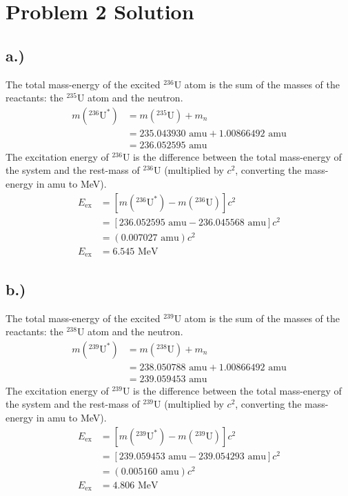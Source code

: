 \documentclass{report}
\begin{document}
\section*{Problem 2 Solution}

\subsection*{a.)}

The total mass-energy of the excited $^{236}$U atom is the sum of the masses of the reactants: the $^{235}$U atom and the neutron.
\begin{align*}
m(^{236}\text{U}^*)	&= m(^{235}\text{U}) + m_n \\
					&= 235.043930\text{ amu} + 1.00866492\text{ amu} \\
					&= 236.052595\text{ amu}
\end{align*}
The excitation energy of $^{236}$U is the difference between the total mass-energy of the system and the rest-mass of $^{236}$U (multiplied by $c^2$, converting the mass-energy in amu to MeV).
\begin{align*}
E_{\text{ex}}	&= \left[m(^{236}\text{U}^*) - m(^{236}\text{U})\right]c^2 \\
				&= \left[236.052595\text{ amu} - 236.045568\text{ amu}\right]c^2 \\
				&= (0.007027\text{ amu})c^2 \\
E_{\text{ex}}	&= 6.545\text{ MeV} 
\end{align*}


\subsection*{b.)}

The total mass-energy of the excited $^{239}$U atom is the sum of the masses of the reactants: the $^{238}$U atom and the neutron.
\begin{align*}
m(^{239}\text{U}^*)	&= m(^{238}\text{U}) + m_n \\
					&= 238.050788\text{ amu} + 1.00866492\text{ amu} \\
					&= 239.059453\text{ amu}
\end{align*}
The excitation energy of $^{239}$U is the difference between the total mass-energy of the system and the rest-mass of $^{239}$U (multiplied by $c^2$, converting the mass-energy in amu to MeV).
\begin{align*}
E_{\text{ex}}	&= \left[m(^{239}\text{U}^*) - m(^{239}\text{U})\right]c^2 \\
				&= \left[239.059453\text{ amu} - 239.054293\text{ amu}\right]c^2 \\
				&= (0.005160\text{ amu})c^2 \\
E_{\text{ex}}	&= 4.806\text{ MeV} 
\end{align*}
\end{document}
